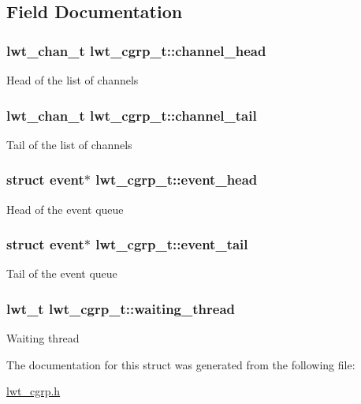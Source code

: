 \subsection{Field Documentation}
\hypertarget{structlwt__cgrp_a50c0e0c6ae5d35a6fcb1c42098e3fc4d}{
\subsubsection[{channel\+\_\+head}]{\setlength{\rightskip}{0pt plus 5cm}lwt\+\_\+chan\+\_\+t lwt\+\_\+cgrp\+\_\+t\+::channel\+\_\+head}}\label{structlwt__cgrp_a50c0e0c6ae5d35a6fcb1c42098e3fc4d}
Head of the list of channels \hypertarget{structlwt__cgrp_addf100f46a0a912555c71bb1efe43380}{
\subsubsection[{channel\+\_\+tail}]{\setlength{\rightskip}{0pt plus 5cm}lwt\+\_\+chan\+\_\+t lwt\+\_\+cgrp\+\_\+t\+::channel\+\_\+tail}}\label{structlwt__cgrp_addf100f46a0a912555c71bb1efe43380}
Tail of the list of channels \hypertarget{structlwt__cgrp_a0b10e0f366557a71518836f2c12328f5}{
\subsubsection[{event\+\_\+head}]{\setlength{\rightskip}{0pt plus 5cm}struct {\bf event}$\ast$ lwt\+\_\+cgrp\+\_\+t\+::event\+\_\+head}}\label{structlwt__cgrp_a0b10e0f366557a71518836f2c12328f5}
Head of the event queue \hypertarget{structlwt__cgrp_a180417922953d4a26cf88f429dde623e}{
\subsubsection[{event\+\_\+tail}]{\setlength{\rightskip}{0pt plus 5cm}struct {\bf event}$\ast$ lwt\+\_\+cgrp\+\_\+t\+::event\+\_\+tail}}\label{structlwt__cgrp_a180417922953d4a26cf88f429dde623e}
Tail of the event queue \hypertarget{structlwt__cgrp_ac77ed0ee0cf31bd27b995749f819c32b}{
\subsubsection[{waiting\+\_\+thread}]{\setlength{\rightskip}{0pt plus 5cm}lwt\+\_\+t lwt\+\_\+cgrp\+\_\+t\+::waiting\+\_\+thread}}\label{structlwt__cgrp_ac77ed0ee0cf31bd27b995749f819c32b}
Waiting thread 

The documentation for this struct was generated from the following file\+:\begin{DoxyCompactItemize}
\item 
\hyperlink{lwt__cgrp_8h}{lwt\+\_\+cgrp.\+h}\end{DoxyCompactItemize}
